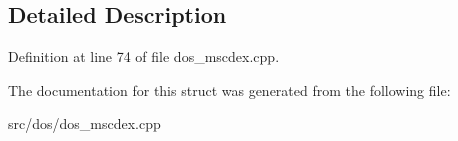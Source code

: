 \subsection{Detailed Description}


Definition at line 74 of file dos\-\_\-mscdex.\-cpp.



The documentation for this struct was generated from the following file\-:\begin{DoxyCompactItemize}
\item 
src/dos/dos\-\_\-mscdex.\-cpp\end{DoxyCompactItemize}
